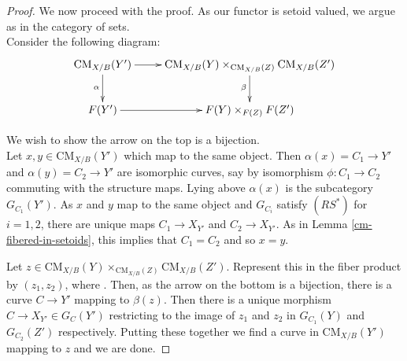 \documentclass{stacks-project}
\theoremstyle{plain}
\theoremstyle{definition}
\theoremstyle{remark}
\numberwithin{equation}{subsection}
\def\CMfunctor{\mathcal{C}\!{\it oh}}
\def\CMfunctor{\text{CM}}
\begin{document}
\begin{proof}
We now proceed with the proof. As our functor is setoid valued, we argue as in the category of sets.\\

Consider the following diagram:
$$
\xymatrix{
\CMfunctor_{X/B}(Y') \ar[r] \ar[d]_\alpha & \CMfunctor_{X/B}(Y)\times_{\CMfunctor_{X/B}(Z)} \CMfunctor_{X/B}(Z') \ar[d] _\beta\\
F(Y') \ar[r] & F(Y)\times_{F(Z)} F(Z')}
$$

We wish to show the arrow on the top is a bijection.\\

Let $x,y \in \CMfunctor_{X/B}(Y')$ which map to the same object. Then $\alpha(x) = C_1 \to Y'$ and $\alpha(y) = C_2 \to Y'$ are isomorphic curves, say by isomorphism $\phi: C_1 \to C_2$ commuting with the structure maps. Lying above $\alpha(x)$ is the subcategory $G_{C_1}(Y')$. As $x$ and $y$ map to the same object and $G_{C_i}$ satisfy $(RS^*)$ for $i=1,2$, there are unique maps $C_1 \to X_{Y'}$ and $C_2 \to X_{Y'}$. As in Lemma \ref{cm-fibered-in-setoids}, this implies that $C_1=C_2$ and so $x=y$.

Let $z \in \CMfunctor_{X/B}(Y)\times_{\CMfunctor_{X/B}(Z)} \CMfunctor_{X/B}(Z')$. Represent this in the fiber product by $(z_1,z_2)$, where . Then, as the arrow on the bottom is a bijection, there is a curve $C \to Y'$ mapping to $\beta(z)$. Then there is a unique morphism $C \to X_{Y'} \in G_C(Y')$ restricting to the image of $z_1$ and $z_2$ in $G_{C_1}(Y)$ and $G_{C_2}(Z')$ respectively. Putting these together we find a curve in $\CMfunctor_{X/B}(Y')$ mapping to $z$ and we are done.
\end{proof}
\end{document}
